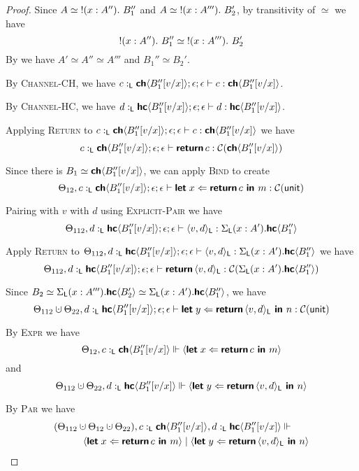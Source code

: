 \begin{proof}
  \noindent
  Since $A \simeq {{!}({x : A''}).\ {B_1''}}$ and $A \simeq {{!}({x : A'''}).\ {B_2'}}$, by
  transitivity of $\simeq$ we have $${{!}({x : A''}).\ {B_1''}} \simeq {{!}({x : A'''}).\ {B_2'}}$$
  By  we have $A' \simeq A'' \simeq A'''$ and $B_1'' \simeq B_2'$. 

  \noindent
  By \textsc{Channel-CH}, we have $c :_{\textsf{L}} {\textbf{\textsf{ch}}\langle{B_1''[v/x]}\rangle} ; \epsilon ; \epsilon \vdash c : {\textbf{\textsf{ch}}\langle{B_1''[v/x]}\rangle}$.

  \noindent
  By \textsc{Channel-HC}, we have $d :_{\textsf{L}} {\textbf{\textsf{hc}}\langle{B_1''[v/x]}\rangle} ; \epsilon ; \epsilon \vdash d : {\textbf{\textsf{hc}}\langle{B_1''[v/x]}\rangle}$.

  \noindent
  Applying \textsc{Return} to ${c :_{\textsf{L}} {\textbf{\textsf{ch}}\langle{B_1''[v/x]}\rangle} ; \epsilon ; \epsilon \vdash c : {\textbf{\textsf{ch}}\langle{B_1''[v/x]}\rangle}}$
  we have $${c :_{\textsf{L}} {\textbf{\textsf{ch}}\langle{B_1''[v/x]}\rangle} ; \epsilon ; \epsilon \vdash \textbf{\textsf{return}}\,{c} : \mathcal{C}({{\textbf{\textsf{ch}}\langle{B_1''[v/x]}\rangle}})}$$

  \noindent
  Since there is $B_1 \simeq {\textbf{\textsf{ch}}\langle{B_1''[v/x]}\rangle}$, we can apply \textsc{Bind} to create
  $$\Theta_{12}, c :_{\textsf{L}} {\textbf{\textsf{ch}}\langle{B_1''[v/x]}\rangle} ; \epsilon ; \epsilon \vdash \textbf{\textsf{let}}\;{x}\Leftarrow{\textbf{\textsf{return}}\,{c}}\textbf{\textsf{ in }}{m} : \mathcal{C}({\textsf{unit}})$$

  \noindent
  Pairing with $v$ with $d$ using \textsc{Explicit-Pair} we have
  $$\Theta_{112}, d :_{\textsf{L}} {\textbf{\textsf{hc}}\langle{B_1''[v/x]}\rangle} ; \epsilon ; \epsilon \vdash \langle{{v},{d}}\rangle_{\textsf{L}} : \Sigma_{\textsf{L}}({x : A'}).{{\textbf{\textsf{hc}}\langle{B_1''}\rangle}}$$

  \noindent
  Apply \textsc{Return} to 
  $\Theta_{112}, d :_{\textsf{L}} {\textbf{\textsf{hc}}\langle{B_1''[v/x]}\rangle} ; \epsilon ; \epsilon \vdash \langle{{v},{d}}\rangle_{\textsf{L}} : \Sigma_{\textsf{L}}({x : A'}).{{\textbf{\textsf{hc}}\langle{B_1''}\rangle}}$
  we have
  $$\Theta_{112}, d :_{\textsf{L}} {\textbf{\textsf{hc}}\langle{B_1''[v/x]}\rangle} ; \epsilon ; \epsilon \vdash \textbf{\textsf{return}}\,{\langle{{v},{d}}\rangle_{\textsf{L}}} : \mathcal{C}({\Sigma_{\textsf{L}}({x : A'}).{{\textbf{\textsf{hc}}\langle{B_1''}\rangle}}})$$

  \noindent
  Since $B_2 \simeq \Sigma_{\textsf{L}}({x : A'''}).{{\textbf{\textsf{hc}}\langle{B_2'}\rangle}} \simeq \Sigma_{\textsf{L}}({x : A'}).{{\textbf{\textsf{hc}}\langle{B_1''}\rangle}}$, we have
  $$\Theta_{112} \dotcup \Theta_{22}, d \tL \HC{B_1''[v/x]} ; \epsilon ; \epsilon \vdash \letin{y}{\return{\pairR{v}{d}{\Ln}}}{n} : \CM{\unit}$$

  \noindent
  By \textsc{Expr} we have
  $$\Theta_{12}, c :_{\textsf{L}} {\textbf{\textsf{ch}}\langle{B_1''[v/x]}\rangle} \Vdash {\langle{\textbf{\textsf{let}}\;{x}\Leftarrow{\textbf{\textsf{return}}\,{c}}\textbf{\textsf{ in }}{m}}\rangle}$$
  and
  $$\Theta_{112} \dotcup \Theta_{22}, d \tL \HC{B_1''[v/x]} \Vdash \proc{\letin{y}{\return{\pairR{v}{d}{\Ln}}}{n}}$$

  \noindent
  By \textsc{Par} we have
  \begin{align*}
  &(\Theta_{112} \dotcup \Theta_{12} \dotcup \Theta_{22}), c \tL \CH{B_1''[v/x]}, d \tL \HC{B_1''[v/x]} \Vdash \\
  &\qquad\quad\proc{\letin{x}{\return{c}}{m}} \mid \proc{\letin{y}{\return{\pairR{v}{d}{\Ln}}}{n}}
  \end{align*}


\end{proof}
